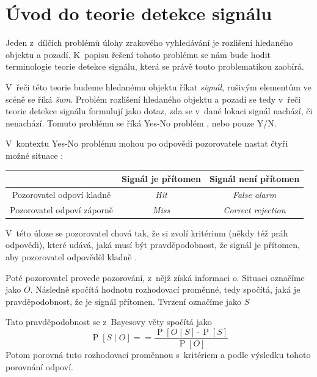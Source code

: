 \section{Úvod do teorie detekce signálu}

Jeden z~dílčích problémů úlohy zrakového vyhledávání je rozlišení hledaného
objektu a pozadí. K~popisu řešení tohoto problému se nám bude hodit
terminologie teorie detekce signálu, která se právě touto problematikou
zaobírá.

V~řeči této teorie budeme hledanému objektu říkat {\it signál},
rušivým elementům ve scéně se říká {\it šum}. Problém rozlišení hledaného
objektu a pozadí se tedy v~řeči teorie detekce signálu formulují jako dotaz,
zda se v~dané lokaci signál nachází, či nenachází. Tomuto problému se říká Yes-No
problém \citep{NeilSDT}, nebo pouze Y/N.

V~kontextu Yes-No problému mohou po odpovědi pozorovatele nastat čtyři možné situace \citep{GreenSDT}:

\bigskip\noindent
\begin{center}
\begin{tabular}{ccc}
\hline
\hline
& Signál je přítomen & Signál není přítomen \\
\hline
Pozorovatel odpoví kladně &{\it Hit}&{\it False alarm} \\
Pozorovatel odpoví záporně &{\it Miss}&{\it Correct rejection}\\
\hline
\hline
\end{tabular}
\end{center}
\bigskip
{}

 V~této úloze se pozorovatel chová tak,
že si zvolí kritérium (někdy též práh odpovědi), které udává, jaká musí být
pravděpodobnost, že signál je přítomen, aby pozorovatel odpověděl kladně \citep[kapitola 1.7]{GreenSDT}.

\def\P#1{\operatorname{P}\left[#1\right]}
\def\E#1{\mathbb{E}\left[#1\right]}
\def\tP#1{\P{\text{#1}}}

Poté pozorovatel provede pozorování, z~nějž získá informaci $o$. Situaci
 označíme jako $O$. Následně spočítá hodnotu
rozhodovací proměnné, tedy spočítá, jaká je pravděpodobnost, že je signál
přítomen. Tvrzení  označíme jako $S$

Tato pravděpodobnost se z~Bayesovy věty spočítá jako 
\begin{equation*}
\P{S\mid O} = =\frac{\P{O\mid S}\cdot\P{S}}{\P{O}} 
\end{equation*}
Potom porovná tuto rozhodovací proměnnou s~kritériem a podle výsledku tohoto
porovnání odpoví.

